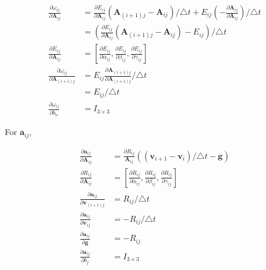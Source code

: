 \documentclass[12pt]{article}   %
\begin{document}
\begin{appendices}
\begin{align}
\frac{\partial \omega_{ij}}{\partial \textbf{A}_{ij}} &= \frac{\partial E_{ij}}{\partial \textbf{A}_{ij}} (\textbf{A}_{(i+1)j} - \textbf{A}_{ij})/\triangle t + E_{ij} (- \frac{\partial \textbf{A}_{ij}}{\partial \textbf{A}_{ij}})/\triangle t \nonumber \\
&= (\frac{\partial E_{ij}}{\partial \textbf{A}_{ij}} (\textbf{A}_{(i+1)j} - \textbf{A}_{ij}) - E_{ij})/\triangle t \\
\frac{\partial E_{ij}}{\partial \textbf{A}_{ij}} &= [\frac{\partial E_{ij}}{\partial \alpha_{ij}}, \frac{\partial E_{ij}}{\partial \beta_{ij}}, \frac{\partial E_{ij}}{\partial \gamma_{ij}}] \\
\frac{\partial \omega_{ij}}{\partial \textbf{A}_{(i+1)j}} &= E_{ij} \frac{\partial \textbf{A}_{(i+1)j}}{\partial \textbf{A}_{(i+1)j}}/\triangle t \\
&= E_{ij}/\triangle t \\
\frac{\partial \omega_{ij}}{\partial b_{\omega}} &= I_{3\times 3} 
\end{align}

For $\textbf{a}_{ij}$,

\begin{align}
\frac{\partial \textbf{a}_{ij}}{\partial \textbf{A}_{ij}} &= \frac{\partial R_{ij}} {\textbf{A}_{ij}} ((\textbf{v}_{i+1} - \textbf{v}_i) / \triangle t - \textbf{g}) \\
\frac{\partial R_{ij}}{\partial \textbf{A}_{ij}} &= [\frac{\partial R_{ij}}{\partial \alpha_{ij}}, \frac{\partial R_{ij}}{\partial \beta_{ij}}, \frac{\partial R_{ij}}{\partial \gamma_{ij}}] \\
\frac{\partial \textbf{a}_{ij}}{\partial \textbf{v}_{(i+1)j}} &= R_{ij} / \triangle t \\
\frac{\partial \textbf{a}_{ij}}{\partial \textbf{v}_{ij}} &= - R_{ij} / \triangle t \\
\frac{\partial \textbf{a}_{ij}}{\partial \textbf{g}} &= - R_{ij}\\
\frac{\partial \textbf{a}_{ij}}{\partial b_{f}} &= I_{3\times 3} 
\end{align}


\end{appendices}
\end{document}
